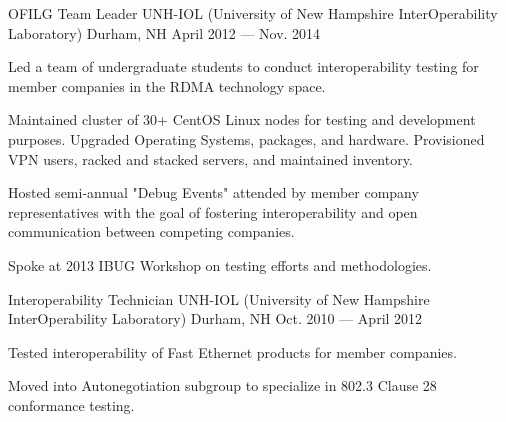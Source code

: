 \begin{cventries}
  \cventry
    {OFILG Team Leader} %
    {UNH-IOL (University of New Hampshire InterOperability Laboratory)} %
    {Durham, NH} %
    {April 2012 --- Nov. 2014} %
    {
      \begin{cvitems} %
        \item {Led a team of undergraduate students to conduct interoperability testing for member companies in the RDMA technology space.}
        \item {Maintained cluster of 30+ CentOS Linux nodes for testing and development purposes. Upgraded Operating Systems, packages, and hardware. Provisioned VPN users, racked and stacked servers, and maintained inventory.}
        \item {Hosted semi-annual "Debug Events" attended by member company representatives with the goal of fostering interoperability and open communication between competing companies.}
        \item {Spoke at 2013 IBUG Workshop on testing efforts and methodologies.}
      \end{cvitems}
    }

  \cventry
    {Interoperability Technician} %
    {UNH-IOL (University of New Hampshire InterOperability Laboratory)} %
    {Durham, NH} %
    {Oct. 2010 --- April 2012} %
    {
      \begin{cvitems} %
        \item {Tested interoperability of Fast Ethernet products for member companies.}
        \item {Moved into Autonegotiation subgroup to specialize in 802.3 Clause 28 conformance testing.}
      \end{cvitems}
    }

\end{cventries}
